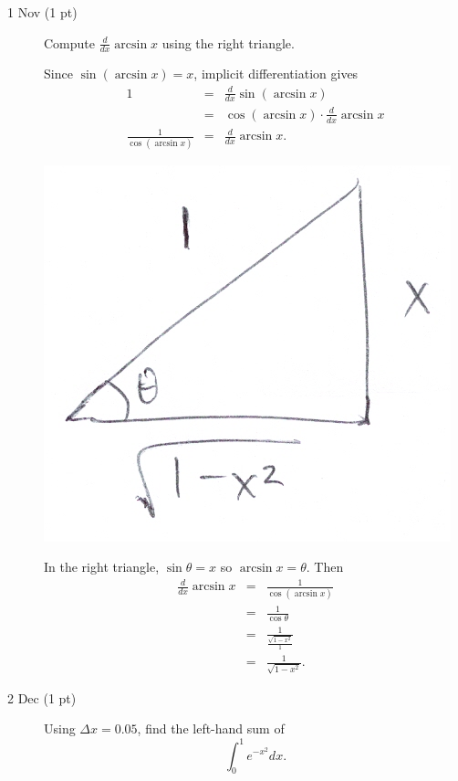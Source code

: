 \documentclass[11pt,letterpaper]{article}
\begin{document}
\begin{description}
\item[1 Nov (1 pt)]  Compute $\frac{d}{dx}\arcsin{x}$ using the right triangle.

\vspace{.5pc}
Since $\sin{(\arcsin{x})}=x$, implicit differentiation gives
\begin{eqnarray*}
 1 &=& \frac{d}{dx}\sin{(\arcsin{x})} \\
&=& \cos{(\arcsin{x})}\cdot \frac{d}{dx}\arcsin{x} \\
\frac{1}{\cos{(\arcsin{x})}} &=& \frac{d}{dx}\arcsin{x}. 
\end{eqnarray*}
\begin{center}
 \includegraphics[scale=.2]{ecpic20001.jpg}
\end{center}
In the right triangle, $\sin{\theta }=x$ so $\arcsin{x}=\theta $.  Then
\begin{eqnarray*}
 \frac{d}{dx}\arcsin{x} &=& \frac{1}{\cos{(\arcsin{x})}} \\
&=& \frac{1}{\cos{\theta }} \\
&=& \frac{1}{\frac{\sqrt{1-x^2}}{1}} \\
&=& \frac{1}{\sqrt{1-x^2}}.
\end{eqnarray*}

\item[2 Dec (1 pt)]  Using $\Delta x=0.05$, find the left-hand sum of
\[\int_0^1e^{-x^2}dx.\]


\end{description}
\end{document}
